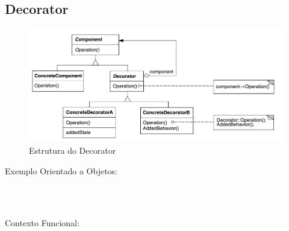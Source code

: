 \subsection{Decorator}

\begin{figure}[htb]
	\caption{\label{fig_grafico}Estrutura do Decorator}
	\begin{center}
	    \includegraphics[scale=0.5]{5_padroes-contexto-funcional/5.2_estruturais/5.2.4_decorator/diagram.png}
	\end{center}
\end{figure}

Exemplo Orientado a Objetos:

\begin{lstlisting}[caption={Decorator Orientado a Objetos},label=oodecorator]



\end{lstlisting}

Contexto Funcional:


\begin{lstlisting}[caption={Decorator Funcional},label=fpdecorator]
    

    
\end{lstlisting}